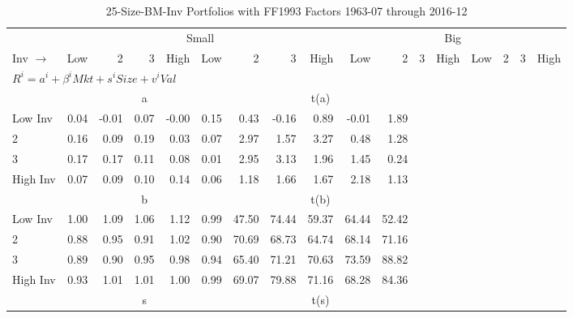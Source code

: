
\begin{table}[!ht]
\centering
\caption{25-Size-BM-Inv Portfolios with FF1993 Factors 1963-07 through 2016-12}
\begin{tabular}{lrrrrrrrrrrrrrrrr}
  \toprule
    & \multicolumn{8}{c}{Small} & \multicolumn{8}{c}{Big} \\
      \cmidrule(r){2-9} \cmidrule(r){10-17}
    Inv $\rightarrow$ & Low & 2 & 3 & High & Low & 2 & 3 & High & Low & 2 & 3 & High & Low & 2 & 3 & High \\ 
  \midrule
  \multicolumn{11}{l}{$R^i=a^i+\beta^iMkt+s^iSize+v^iVal$} \\

  
    
      & \multicolumn{5}{c}{a} & \multicolumn{5}{c}{t(a)}
    
    \\
      \cmidrule(r){2-5} \cmidrule(r){6-9} \cmidrule(r){10-13} \cmidrule(r){14-17}

    Low Inv   & 0.04  & -0.01  & 0.07  & -0.00  & 0.15  & 0.43  & -0.16  & 0.89  & -0.01  & 1.89  \\
           2  & 0.16  & 0.09  & 0.19  & 0.03  & 0.07  & 2.97  & 1.57  & 3.27  & 0.48  & 1.28  \\
           3  & 0.17  & 0.17  & 0.11  & 0.08  & 0.01  & 2.95  & 3.13  & 1.96  & 1.45  & 0.24  \\
    High Inv  & 0.07  & 0.09  & 0.10  & 0.14  & 0.06  & 1.18  & 1.66  & 1.67  & 2.18  & 1.13  \\

  
    
      & \multicolumn{5}{c}{b} & \multicolumn{5}{c}{t(b)}
    
    \\
      \cmidrule(r){2-5} \cmidrule(r){6-9} \cmidrule(r){10-13} \cmidrule(r){14-17}

    Low Inv   & 1.00  & 1.09  & 1.06  & 1.12  & 0.99  & 47.50  & 74.44  & 59.37  & 64.44  & 52.42  \\
           2  & 0.88  & 0.95  & 0.91  & 1.02  & 0.90  & 70.69  & 68.73  & 64.74  & 68.14  & 71.16  \\
           3  & 0.89  & 0.90  & 0.95  & 0.98  & 0.94  & 65.40  & 71.21  & 70.63  & 73.59  & 88.82  \\
    High Inv  & 0.93  & 1.01  & 1.01  & 1.00  & 0.99  & 69.07  & 79.88  & 71.16  & 68.28  & 84.36  \\

  
    
      & \multicolumn{5}{c}{s} & \multicolumn{5}{c}{t(s)}
    

\end{tabular}
\end{table}
